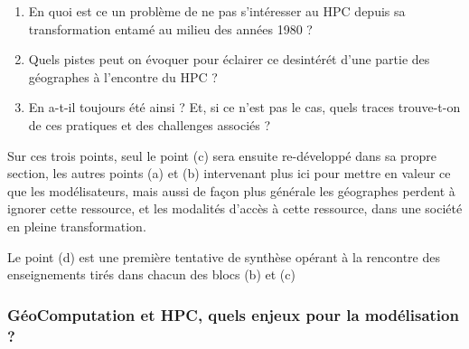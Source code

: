 \begin{enumerate}[label=(\alph*),labelindent=\parindent,leftmargin=*]
\item En quoi est ce un problème de ne pas s'intéresser au HPC depuis sa transformation entamé au milieu des années 1980 ?
\item Quels pistes peut on évoquer pour éclairer ce desintérét d'une partie des géographes à l'encontre du HPC ?
\item En a-t-il toujours été ainsi ? Et, si ce n'est pas le cas, quels traces trouve-t-on de ces pratiques et des challenges associés ?
\end{enumerate}


Sur ces trois points, seul le point (c) sera ensuite re-développé dans sa propre section, les autres points (a) et (b) intervenant plus ici pour mettre en valeur ce que les modélisateurs, mais aussi de façon plus générale les géographes perdent à ignorer cette ressource, et les modalités d'accès à cette ressource, dans une société en pleine transformation.

Le point (d) est une première tentative de synthèse opérant à la rencontre des enseignements tirés dans chacun des blocs (b) et (c)


\subsubsection{GéoComputation et HPC, quels enjeux pour la modélisation ? }
\label{sssec:enjeuxHPC}

